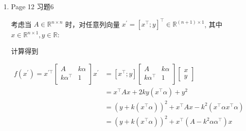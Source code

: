 \documentclass{article}
\begin{document}
\begin{enumerate}
\begin{spacing}{1.5}
\begin{equation*}
\begin{array}{ll}
            \right] \\
            & = 
            \left[
                \begin{array}{cc}
                    A^{-1} + A^{-1}B(D_m-CA^{-1}B)^{-1}CA^{-1} & -A^{-1}B(D_m-CA^{-1}B)^{-1} \\
                    -(D_m-CA^{-1}B)^{-1}CA^{-1} & (D_m-CA^{-1}B)^{-1}\\
                \end{array}
            \right]
        \end{array}
    \end{equation*}
    \end{spacing}
    非常丑，但验证了一下应该是对的。左上角似乎和Woodbury公式的形式是一致的。
    
    \item Page 12 习题6
    
    考虑当 $A\in \mathbb{R}^{n\times n}$ 时，对任意列向量 $x^\prime=\left[x^\top; y\right]^\top\in\mathbb{R}^{(n+1)\times 1}$, 其中 $x\in\mathbb{R}^{n\times 1}, y\in\mathbb{R}$:

    计算得到

    \begin{spacing}{1.5}
        
    \begin{equation*}
        \begin{array}{ll}
            f(x^\prime)=x^{\prime\top}\left[\begin{array}{cc}A&k\alpha\\k\alpha^\top&1\\\end{array}\right]x^\prime 
            &= 
            \left[x^\top; y\right]\left[\begin{array}{cc}A&k\alpha\\k\alpha^\top&1\\\end{array}\right]\left[\begin{array}{c}x\\y\end{array}\right]
            \\
            &= x^\top Ax + 2ky(x^\top\alpha)+y^2
            \\
            &= \left(y + k(x^\top\alpha)\right)^2 + x^\top Ax - k^2(x^\top\alpha x^\top\alpha)\\
            &= \left(y + k(x^\top\alpha)\right)^2 + x^\top (A - k^2\alpha\alpha^\top) x

        \end{array}
    \end{equation*}


\end{spacing}
\end{enumerate}
\end{document}
